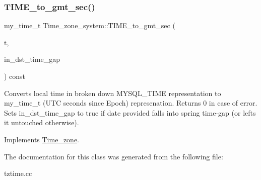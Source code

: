 \subsubsection{\texorpdfstring{T\+I\+M\+E\+\_\+to\+\_\+gmt\+\_\+sec()}{TIME\_to\_gmt\_sec()}}
{\footnotesize\ttfamily my\+\_\+time\+\_\+t Time\+\_\+zone\+\_\+system\+::\+T\+I\+M\+E\+\_\+to\+\_\+gmt\+\_\+sec (\begin{DoxyParamCaption}\item[{const M\+Y\+S\+Q\+L\+\_\+\+T\+I\+ME $\ast$}]{t,  }\item[{my\+\_\+bool $\ast$}]{in\+\_\+dst\+\_\+time\+\_\+gap }\end{DoxyParamCaption}) const\hspace{0.3cm}{\ttfamily [virtual]}}

Converts local time in broken down M\+Y\+S\+Q\+L\+\_\+\+T\+I\+ME representation to my\+\_\+time\+\_\+t (U\+TC seconds since Epoch) represenation. Returns 0 in case of error. Sets in\+\_\+dst\+\_\+time\+\_\+gap to true if date provided falls into spring time-\/gap (or lefts it untouched otherwise). 

Implements \mbox{\hyperlink{classTime__zone_a980bb1d59fe04e899b116169f1b3166d}{Time\+\_\+zone}}.



The documentation for this class was generated from the following file\+:\begin{DoxyCompactItemize}
\item 
tztime.\+cc\end{DoxyCompactItemize}
